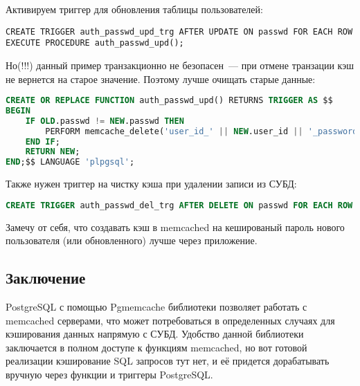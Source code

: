 Активируем триггер для обновления таблицы пользователей:

\begin{lstlisting}[label=lst:pgcache12,caption=Триггер]
CREATE TRIGGER auth_passwd_upd_trg AFTER UPDATE ON passwd FOR EACH ROW EXECUTE PROCEDURE auth_passwd_upd();
\end{lstlisting}

Но(!!!) данный пример транзакционно не безопасен~--- при отмене транзации кэш не вернется на старое значение. Поэтому лучше очищать старые данные:

\begin{lstlisting}[language=SQL,label=lst:pgcache13,caption=Очистка ключа в кэше]
CREATE OR REPLACE FUNCTION auth_passwd_upd() RETURNS TRIGGER AS $$
BEGIN
	IF OLD.passwd != NEW.passwd THEN
		PERFORM memcache_delete('user_id_' || NEW.user_id || '_password');
	END IF;
	RETURN NEW;
END;$$ LANGUAGE 'plpgsql';
\end{lstlisting}

Также нужен триггер на чистку кэша при удалении записи из СУБД:

\begin{lstlisting}[language=SQL,label=lst:pgcache14,caption=Триггер]
CREATE TRIGGER auth_passwd_del_trg AFTER DELETE ON passwd FOR EACH ROW EXECUTE PROCEDURE auth_passwd_upd();
\end{lstlisting}

Замечу от себя, что создавать кэш в memcached на кешированый пароль нового пользователя (или обновленного) лучше через приложение.

\subsection{Заключение}

PostgreSQL с помощью Pgmemcache библиотеки позволяет работать с memcached серверами, что может потребоваться в определенных случаях для кэширования данных напрямую с СУБД. Удобство данной библиотеки заключается в полном доступе к функциям memcached, но вот готовой реализации кэширование SQL запросов тут нет, и её придется дорабатывать вручную через функции и триггеры PostgreSQL.
